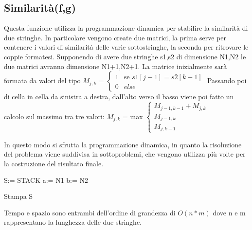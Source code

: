 \documentclass[a4paper,10pt]{article}
\begin{document}
\subsection{Similarità(f,g)}
Questa funzione utilizza la programmazione dinamica per stabilire la similarità di due stringhe. In particolare vengono create due matrici, la prima serve per contenere i valori di similarità delle varie sottostringhe, la seconda per ritrovare le coppie formatesi.
Supponendo di avere due stringhe s1,s2 di dimensione N1,N2 le due matrici avranno dimensione N1+1,N2+1. La matrice inizialmente sarà formata da valori del tipo
$M_{j,k}$ = $\left\{\begin{array}{ll}1 & \mbox{se } s1[j-1]=s2[k-1]\\0 & else\end{array}\right.$
Passando poi di cella in cella da sinistra a destra, dall'alto verso il basso viene poi fatto un calcolo sul massimo tra tre valori:
$M_{j,k}$ = max $\left\{\begin{array}{l}M_{j-1,k-1}+M_{j,k}\\M_{j-1,k}\\M_{j,k-1}\end{array}\right.$

In questo modo si sfrutta la programmazione dinamica, in quanto la risoluzione del problema viene suddivisa in sottoproblemi, che vengono utilizza più volte per la costruzione del risultato finale.

\begin{algorithm}[H]

S:= STACK\;
a:= N1\;
b:= N2\;

Stampa S\;
\end{algorithm}
Tempo e spazio sono entrambi dell'ordine di grandezza di $O(n*m)$ dove n e m rappresentano la lunghezza delle due stringhe.
\end{document}
